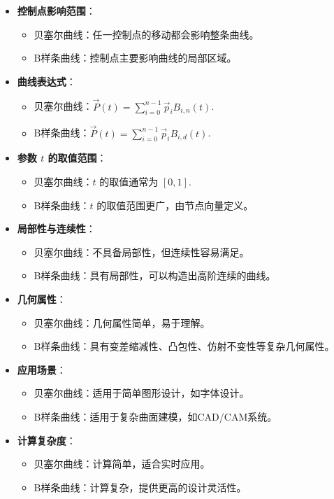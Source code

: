 \documentclass[a4paper,UTF8]{article}
\theoremstyle{definition}
\begin{document}
\begin{itemize}
	\item \textbf{控制点影响范围}：
	\begin{itemize}
		\item 贝塞尔曲线：任一控制点的移动都会影响整条曲线。
		\item B样条曲线：控制点主要影响曲线的局部区域。
	\end{itemize}
	
	\item \textbf{曲线表达式}：
	\begin{itemize}
		\item 贝塞尔曲线：$\vec{P}(t) = \sum_{i=0}^{n-1} \vec{p}_i B_{i,n}(t)$.
		\item B样条曲线：$\vec{P}(t) = \sum_{i=0}^{n-1} \vec{p}_i B_{i,d}(t)$.
	\end{itemize}
	
	\item \textbf{参数 $t$ 的取值范围}：
	\begin{itemize}
		\item 贝塞尔曲线：$t$ 的取值通常为 $[0, 1]$.
		\item B样条曲线：$t$ 的取值范围更广，由节点向量定义。
	\end{itemize}
	
	\item \textbf{局部性与连续性}：
	\begin{itemize}
		\item 贝塞尔曲线：不具备局部性，但连续性容易满足。
		\item B样条曲线：具有局部性，可以构造出高阶连续的曲线。
	\end{itemize}
	
	\item \textbf{几何属性}：
	\begin{itemize}
		\item 贝塞尔曲线：几何属性简单，易于理解。
		\item B样条曲线：具有变差缩减性、凸包性、仿射不变性等复杂几何属性。
	\end{itemize}
	
	\item \textbf{应用场景}：
	\begin{itemize}
		\item 贝塞尔曲线：适用于简单图形设计，如字体设计。
		\item B样条曲线：适用于复杂曲面建模，如CAD/CAM系统。
	\end{itemize}
	
	\item \textbf{计算复杂度}：
	\begin{itemize}
		\item 贝塞尔曲线：计算简单，适合实时应用。
		\item B样条曲线：计算复杂，提供更高的设计灵活性。
	\end{itemize}
	

\end{itemize}
\end{document}
